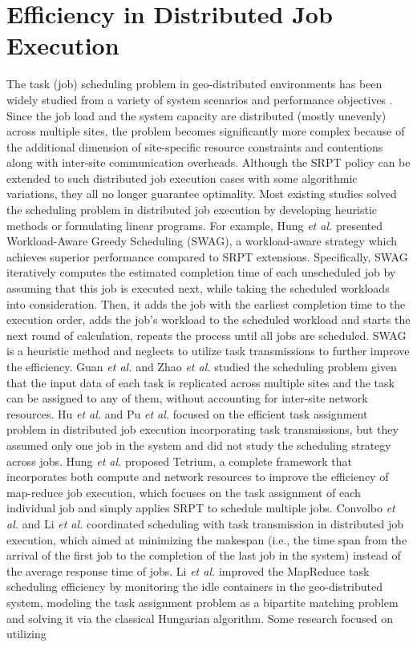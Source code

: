 \section{Efficiency in Distributed Job Execution}
The task (job) scheduling problem in geo-distributed environments has been widely studied from a variety of system scenarios and performance objectives \cite{gautam2015survey, ghomi2017load, hedayati2023mapreduce, wu2025task}. Since the job load and the system capacity are distributed (mostly unevenly) across multiple sites, the problem becomes significantly more complex because of the additional dimension of site-specific resource constraints and contentions along with inter-site communication overheads. Although the SRPT policy can be extended to such distributed job execution cases with some algorithmic variations, they all no longer guarantee optimality. Most existing studies solved the scheduling problem in distributed job execution by developing heuristic methods or formulating linear programs. For example, Hung \textit{et al.} \cite{hung2015scheduling} presented Workload-Aware Greedy Scheduling (SWAG), a workload-aware strategy which achieves superior performance compared to SRPT extensions. Specifically, SWAG iteratively computes the estimated completion time of each unscheduled job by assuming that this job is executed next, while taking the scheduled workloads into consideration. Then, it adds the job with the earliest completion time to the execution order, adds the job's workload to the scheduled workload and starts the next round of calculation, repeats the process until all jobs are scheduled. SWAG is a heuristic method and neglects to utilize task transmissions to further improve the efficiency. Guan \textit{et al.} \cite{guan2022task} and Zhao \textit{et al.} \cite{zhao2025data} studied the scheduling problem given that the input data of each task is replicated across multiple sites and the task can be assigned to any of them, without accounting for inter-site network resources. Hu \textit{et al.} \cite{hu2016flutter} and Pu \textit{et al.} \cite{pu2015low} focused on the efficient task assignment problem in distributed job execution incorporating task transmissions, but they assumed only one job in the system and did not study the scheduling strategy across jobs. Hung \textit{et al.} \cite{hung2018wide} proposed Tetrium, a complete framework that incorporates both compute and network resources to improve the efficiency of map-reduce job execution, which focuses on the task assignment of each individual job and simply applies SRPT to schedule multiple jobs. Convolbo \textit{et al.} \cite{GEODIS} and Li \textit{et al.} \cite{li2020load} coordinated scheduling with task transmission in distributed job execution, which aimed at minimizing the makespan (i.e., the time span from the arrival of the first job to the completion of the last job in the system) instead of the average response time of jobs. Li \textit{et al.} \cite{li2021mapreduce} improved the MapReduce task scheduling efficiency by monitoring the idle containers in the geo-distributed system, modeling the task assignment problem as a bipartite matching problem and solving it via the classical Hungarian algorithm. Some research focused on utilizing 
